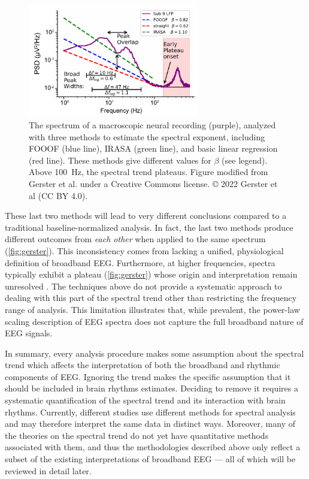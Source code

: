 \begin{figure}
\vspace{-15pt}
\includegraphics[width=75mm]{Figures/chapter1/gerster.pdf}
\vspace{-10pt}
\caption[Difficulties of estimating spectral exponents with various methods]{ The spectrum of a macroscopic neural recording (purple), analyzed with three methods to estimate the spectral exponent, including FOOOF (blue line), IRASA (green line), and basic linear regression (red line). These methods give different values for $\beta$ (see legend). Above \qty{100}{\hertz}, the spectral trend plateaus. Figure modified from Gerster et al. \cite{Gerster2022} under a Creative Commons license. © 2022 Gerster et al (CC BY 4.0).
} \label{fig:gerster}
\end{figure}

These last two methods will lead to very different conclusions compared to a traditional baseline-normalized analysis. In fact, the last two methods produce different outcomes from \textit{each other} when applied to the same spectrum (\autoref{fig:gerster}). This inconsistency comes from lacking a unified, physiological definition of broadband EEG. Furthermore, at higher frequencies, spectra typically exhibit a plateau  (\autoref{fig:gerster}) whose origin and interpretation remain unresolved \cite{Gerster2022}. The techniques above do not provide a systematic approach to dealing with this part of the spectral trend other than restricting the frequency range of analysis. This limitation illustrates that, while prevalent, the power-law scaling description of EEG spectra does not capture the full broadband nature of EEG signals. 

In summary, every analysis procedure makes some assumption about the spectral trend which affects the interpretation of both the broadband and rhythmic components of EEG. Ignoring the trend makes the specific assumption that it should be included in brain rhythms estimates. Deciding to remove it requires a systematic quantification of the spectral trend and its interaction with brain rhythms. Currently, different studies use different methods for spectral analysis and may therefore interpret the same data in distinct ways. Moreover, many of the theories on the spectral trend do not yet have quantitative methods associated with them, and thus the methodologies described above only reflect a subset of the existing interpretations of broadband EEG --- all of which will be reviewed in detail later.

